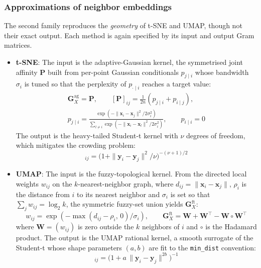 \documentclass[11pt]{article}
\begin{document}
	\subsubsection{Approximations of neighbor embeddings}
	\label{subsec:tested_approx}
	
	The second family reproduces the \emph{geometry} of t-SNE and UMAP, though not
	their exact output. Each method is again specified by its input and output Gram
	matrices.
	
	\begin{itemize}
		\item \textbf{t-SNE}: The input is the adaptive-Gaussian kernel, the symmetrised joint affinity $\mathbf{P}$ built from per-point Gaussian conditionals $p_{j\mid i}$ whose bandwidth $\sigma_i$ is tuned so that the perplexity of $p_{\cdot\mid i}$ reaches a target value:
		\begin{equation}
			\begin{gathered}
				\mathbf{G}^\text{ag}_X = \mathbf{P}, \qquad [\mathbf{P}]_{ij} = \tfrac{1}{2n}\left(p_{j\mid i}+p_{i\mid j}\right), \\[2pt]
				p_{j\mid i} = \frac{\exp\left(-\|\mathbf{x}_i-\mathbf{x}_j\|^2 / 2\sigma_i^2\right)}{\sum_{l\neq i}\exp\!\left(-\|\mathbf{x}_i-\mathbf{x}_l\|^2 / 2\sigma_i^2\right)}, \qquad p_{i\mid i}=0
			\end{gathered}
		\end{equation}
		The output is the heavy-tailed Student-t kernel with $\nu$ degrees of freedom, which mitigates the crowding problem:
		\begin{equation}
			[\mathbf{G}^\text{stu}_Y]_{ij} = \bigl(1+\|\mathbf{y}_i-\mathbf{y}_j\|^2 / \nu\bigr)^{-(\nu+1)/2}
		\end{equation}
		
		\item \textbf{UMAP}: The input is the fuzzy-topological kernel. From the directed local weights $w_{ij}$ on the $k$-nearest-neighbor graph, where $d_{ij}=\|\mathbf{x}_i-\mathbf{x}_j\|$, $\rho_i$ is the distance from $i$ to its nearest neighbor and $\sigma_i$ is set so that $\sum_j w_{ij}=\log_2 k$, the symmetric fuzzy-set union yields $\mathbf{G}^\text{ft}_X$:
		\begin{equation}
			w_{ij} = \exp\left(-\max(d_{ij}-\rho_i,\,0) / \sigma_i\right), \qquad
			\mathbf{G}^\text{ft}_X = \mathbf{W}+\mathbf{W}^\top-\mathbf{W}\circ\mathbf{W}^\top
		\end{equation}
		where $\mathbf{W}=(w_{ij})$ is zero outside the $k$ neighbors of $i$ and $\circ$ is the Hadamard product. The output is the UMAP rational kernel, a smooth surrogate of the Student-t whose shape parameters $(a,b)$ are fit to the \texttt{min\_dist} convention:
		\begin{equation}
			[\mathbf{G}^\text{umap}_Y]_{ij} = \bigl(1+a\,\|\mathbf{y}_i-\mathbf{y}_j\|^{2b}\bigr)^{-1}
		\end{equation}
	\end{itemize}
	
\end{document}

